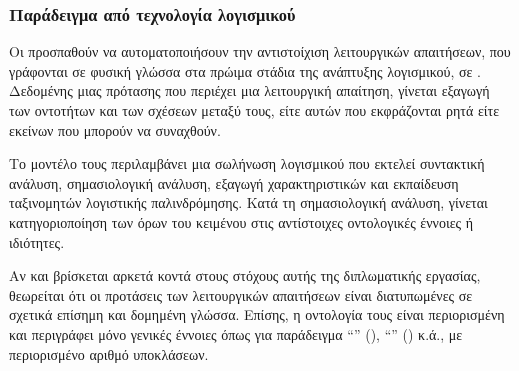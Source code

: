 \subsubsection{Παράδειγμα από τεχνολογία λογισμικού}
Οι \citet{diamantopoulos2017software} προσπαθούν να αυτοματοποιήσουν την αντιστοίχιση λειτουργικών απαιτήσεων,
που γράφονται σε φυσική γλώσσα στα πρώιμα στάδια της ανάπτυξης λογισμικού,
σε .
Δεδομένης μιας πρότασης που περιέχει μια λειτουργική απαίτηση, γίνεται εξαγωγή των οντοτήτων και των σχέσεων μεταξύ τους,
είτε αυτών που εκφράζονται ρητά είτε εκείνων που μπορούν να συναχθούν.

Το μοντέλο τους περιλαμβάνει μια σωλήνωση λογισμικού που εκτελεί συντακτική ανάλυση, σημασιολογική ανάλυση, εξαγωγή χαρακτηριστικών και εκπαίδευση ταξινομητών λογιστικής παλινδρόμησης.
Κατά τη σημασιολογική ανάλυση, γίνεται κατηγοριοποίηση των όρων του κειμένου στις αντίστοιχες οντολογικές έννοιες ή ιδιότητες.

Αν και βρίσκεται αρκετά κοντά στους στόχους αυτής της διπλωματικής εργασίας, θεωρείται ότι οι προτάσεις των λειτουργικών απαιτήσεων είναι διατυπωμένες σε σχετικά επίσημη και δομημένη γλώσσα.
Επίσης, η οντολογία τους είναι περιορισμένη και περιγράφει μόνο γενικές έννοιες όπως για παράδειγμα \enquote{} (), \enquote{} () κ.ά.,
με περιορισμένο αριθμό υποκλάσεων.

